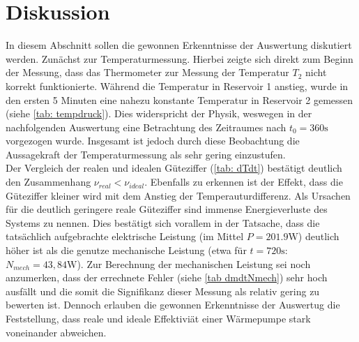 \section{Diskussion}
In diesem Abschnitt sollen die gewonnen Erkenntnisse der Auswertung diskutiert werden. Zunächst zur Temperaturmessung.
Hierbei zeigte sich direkt zum Beginn der Messung, dass das Thermometer zur Messung der Temperatur $T_2$ nicht korrekt
funktionierte. Während die Temperatur in Reservoir 1 anstieg, wurde in den ersten 5 Minuten eine nahezu konstante Temperatur
in Reservoir 2 gemessen (siehe \ref{tab: tempdruck}). Dies widerspricht der Physik, weswegen in der nachfolgenden Auswertung
eine Betrachtung des Zeitraumes nach $t_0 = 360\si{\second}$ vorgezogen wurde. Insgesamt ist jedoch durch diese Beobachtung
die Aussagekraft der Temperaturmessung als sehr gering einzustufen. \\
Der Vergleich der realen und idealen Güteziffer (\ref{tab: dTdt}) bestätigt deutlich den Zusammenhang $\nu_{real} < \nu_{ideal}$. Ebenfalls
zu erkennen ist der Effekt, dass die Güteziffer kleiner wird mit dem Anstieg der Temperauturdifferenz. Als Ursachen für die deutlich
geringere reale Güteziffer sind immense Energieverluste des Systems zu nennen. Dies bestätigt sich vorallem in der Tatsache, dass die tatsächlich
aufgebrachte elektrische Leistung (im Mittel $P = 201.9 \si{\watt}$) deutlich höher ist als die genutze mechanische Leistung (etwa
für $t = 720 \si{\second}$: $N_{mech} = 43,84 \si{\watt}$). Zur Berechnung der mechanischen Leistung sei noch anzumerken, dass der errechnete
Fehler (siehe \ref{tab dmdtNmech}) sehr hoch ausfällt und die somit die Signifikanz dieser Messung als relativ gering zu bewerten ist. Dennoch %
erlauben die gewonnen Erkenntnisse der Auswertug die Feststellung, dass reale und ideale Effektiviät einer Wärmepumpe stark voneinander abweichen.
